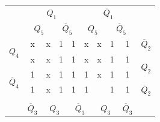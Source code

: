 \documentclass[a4paper,14pt]{article}
\begin{document}
\begin{table}[H]
\begin{minipage}{.5\linewidth}
\begin{tabular}{cccccccccc}
\end{tabular}
	\end{minipage}%
	\begin{minipage}{.5\linewidth}
		\centering
\begin{tabular}{cccccccccc}
	& \multicolumn{4}{c}{$Q_1$}                                                                         & \multicolumn{4}{c}{$\overline{Q}_1$}                                                              &                        \\
	& \multicolumn{2}{c}{$Q_5$}                       & \multicolumn{2}{c}{$\overline{Q}_5$}            & \multicolumn{2}{c}{$Q_5$}                       & \multicolumn{2}{c}{$\overline{Q}_5$}            &                        \\ \cline{2-9}
	\multicolumn{1}{c|}{\multirow{2}{*}{$Q_4$}}            & \multicolumn{1}{c|}{x} & \multicolumn{1}{c|}{x} & \multicolumn{1}{c|}{1} & \multicolumn{1}{c|}{1} & \multicolumn{1}{c|}{x} & \multicolumn{1}{c|}{x} & \multicolumn{1}{c|}{1} & \multicolumn{1}{c|}{1} & $\overline{Q}_2$       \\ \cline{2-9}
	\multicolumn{1}{c|}{}                                  & \multicolumn{1}{c|}{x} & \multicolumn{1}{c|}{x} & \multicolumn{1}{c|}{1} & \multicolumn{1}{c|}{1} & \multicolumn{1}{c|}{x} & \multicolumn{1}{c|}{x} & \multicolumn{1}{c|}{1} & \multicolumn{1}{c|}{1} & \multirow{2}{*}{$Q_2$} \\ \cline{2-9}
	\multicolumn{1}{c|}{\multirow{2}{*}{$\overline{Q}_4$}} & \multicolumn{1}{c|}{1} & \multicolumn{1}{c|}{x} & \multicolumn{1}{c|}{1} & \multicolumn{1}{c|}{1} & \multicolumn{1}{c|}{1} & \multicolumn{1}{c|}{x} & \multicolumn{1}{c|}{1} & \multicolumn{1}{c|}{1} &                        \\ \cline{2-9}
	\multicolumn{1}{c|}{}                                  & \multicolumn{1}{c|}{1} & \multicolumn{1}{c|}{x} & \multicolumn{1}{c|}{1} & \multicolumn{1}{c|}{1} & \multicolumn{1}{c|}{1} & \multicolumn{1}{c|}{}  & \multicolumn{1}{c|}{1} & \multicolumn{1}{c|}{1} & $\overline{Q}_2$       \\ \cline{2-9}
	&                        & \multicolumn{2}{c}{}                            & \multicolumn{2}{c}{}                            & \multicolumn{2}{c}{}                            &                        &                        \\
	& $\overline{Q}_3$       & \multicolumn{2}{c}{$Q_3$}                       & \multicolumn{2}{c}{$\overline{Q}_3$}            & \multicolumn{2}{c}{$Q_3$}                       & $\overline{Q}_3$       &                       
\end{tabular}
	\end{minipage} 
\end{table}
\end{document}
